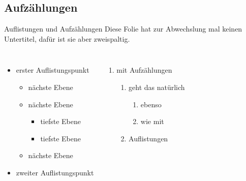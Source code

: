 \documentclass[10pt]{beamer} %
\begin{document}
\subsection{Aufz\"ahlungen}
\begin{frame}{Auflistungen und Aufz\"ahlungen}
   Diese Folie hat zur Abwechslung mal keinen Untertitel, daf\"ur ist sie aber zweispaltig.

   \begin{columns}
         \begin{itemize}
            \item erster Auflistungspunkt
                  \begin{itemize}
                     \item n\"achste Ebene
                     \item n\"achste Ebene
                           \begin{itemize}
                              \item tiefste Ebene
                              \item tiefste Ebene
                           \end{itemize}
                     \item n\"achste Ebene
                  \end{itemize}
            \item zweiter Auflistungspunkt
         \end{itemize}

         \begin{enumerate}
            \item mit Aufz\"ahlungen
                  \begin{enumerate}
                     \item geht das nat\"urlich
                           \begin{enumerate}
                              \item ebenso
                              \item wie mit
                           \end{enumerate}
                     \item Auflistungen
                  \end{enumerate}
         \end{enumerate}
   \end{columns}

\end{frame}
\end{document}
